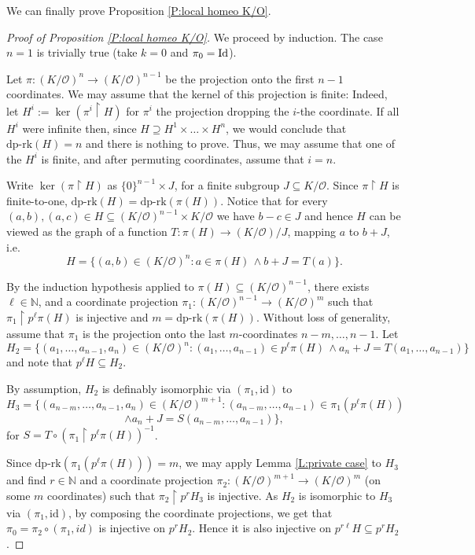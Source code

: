 \documentclass[11pt]{amsart}
\newtheorem{lemma}[theorem]{Lemma}
\theoremstyle{definition}
\newcommand{\CO}{{\mathcal O}}
\newcommand{\0}{\emptyset}
\newcommand{\rest}{\upharpoonright}
\def\dpr{\mathrm{dp\text{-}rk}}
\def\sub{\subseteq}
\begin{document}
	
	
	We can finally prove Proposition \ref{P:local homeo K/O}. 
	
		
	\begin{proof}[Proof of Proposition \ref{P:local homeo K/O}]
	
		We proceed by induction. The case $n=1$ is trivially true (take $k=0$ and $\pi_0=\operatorname{Id}$). 
		
		Let $\pi:(K/\CO)^n\to (K/\CO)^{n-1}$  be the projection onto the first $n-1$ coordinates. We may assume that the kernel of this projection is finite: Indeed, let $H^i:=\ker(\pi^i\rest H)$  for $\pi^i$ the projection dropping the $i$-the coordinate. If all $H^i$ were infinite then, since $H\supseteq H^1\times\dots\times H^n$, we would conclude that $\dpr(H)=n$ and there is nothing to prove. Thus, we may assume that one of the $H^i$ is finite, and after permuting coordinates, assume that $i=n$.
		
		Write $\ker(\pi\rest H)$ as $\{0\}^{n-1}\times J$, for a finite subgroup $J\subseteq K/\CO$. Since $\pi\rest H$ is finite-to-one,  $\dpr(H)=\dpr(\pi(H))$. Notice that for every $(a,b), (a,c)\in H\sub (K/\CO)^{n-1}\times K/\CO$ we have $b-c\in J$ and hence $H$ can be viewed as the graph of a function $T:\pi(H) \to (K/\CO)/J$, mapping $a$ to $b+J$, i.e.
		\[H=\{(a,b)\in (K/\CO)^n:a\in \pi(H)\, \wedge b+J= T(a)\}. \]
		
		By the induction hypothesis applied to $\pi(H)\sub (K/\CO)^{n-1}$,  there exists $\ell\in \mathbb N$, and a coordinate projection $\pi_1:(K/\CO)^{n-1}\to (K/\CO)^m$ such that $\pi_1\rest p^\ell \pi(H)$ is injective and $m=\dpr(\pi(H))$. Without loss of generality, assume that $\pi_1$ is the projection onto  the last $m$-coordinates $n-m,\dots, n-1$. Let
		\[H_2=
		\{(a_1,\dots,a_{n-1},a_n)\in (K/\CO)^n:(a_1,\dots,a_{n-1})\in p^\ell \pi(H)\, \wedge a_n+J= T(a_1,\dots,a_{n-1})\}\]
		and note that $p^\ell H\subseteq H_2$.
		
		By assumption, $H_2$ is definably isomorphic via $(\pi_1,\mathrm{id})$ to
		\[H_3=
		\{(a_{n-m},\dots,a_{n-1},a_n)\in (K/\CO)^{m+1}:(a_{n-m},\dots,a_{n-1})\in \pi_1(p^\ell \pi(H))\,\]\[ \wedge a_n+J= S(a_{n-m},\dots,a_{n-1})\},\] 
		for $S=T\circ (\pi_1\rest p^\ell\pi(H))^{-1}$.
		
		Since $\dpr(\pi_1(p^\ell\pi(H)))=m$, we may apply Lemma \ref{L:private case} to $H_3$ and find $r\in\mathbb{N}$ and a coordinate projection $\pi_2:(K/\CO)^{m+1}\to (K/\CO)^m$ (on some $m$ coordinates) such that $\pi_2\rest p^rH_3$ is injective. As $H_2$ is isomorphic to $H_3$ via $(\pi_1,\mathrm{id})$, by composing the coordinate projections, we get that $\pi_0=\pi_2\circ (\pi_1,id)$ is injective on $p^rH_2$. Hence it is also injective on $p^{r\ell}H\subseteq p^rH_2 $.
	\end{proof}
	
\end{document}
